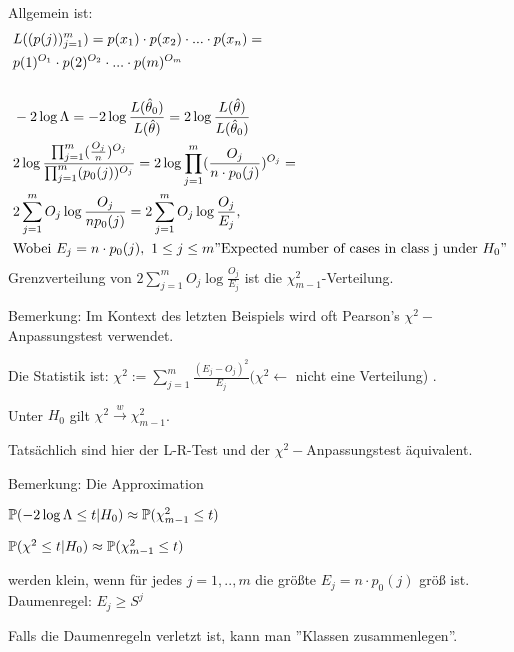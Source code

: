 \documentclass{tstextbook}
\begin{document}
\begin{example}
	Allgemein ist: 
	  \[
	\begin{aligned}
		& L((p(j))^{m}_{j=1}) = p(x_1)\cdot p(x_2)\cdot ... \cdot p(x_n)=\\
		& p(1)^{O_1} \cdot p(2)^{O_2} \cdot ... \cdot p(m)^{O_m} \\
		& \\
		& -2 \log \Lambda = -2 \log \frac{L(\hat{\theta}_0 )}{L(\hat{\theta})}=  2 \log \frac{L(\hat{\theta})}{L(\hat{\theta}_0 )} \\
		& 2 \log \frac{\prod_{j=1}^{m}(\frac{O_j}{n})^{O_j}}{\prod_{j=1}^{m} (p_0(j))^{O_j}} =  2 \log \prod_{j=1}^{m}(\frac{O_j}{n \cdot p_0(j)})^{O_j} = \\
		& 2 \sum_{j=1}^{m} O_j \log \frac{O_j}{n p_0(j)}=  2 \sum_{j=1}^{m} O_j \log \frac{O_j}{E_j} , \\			
		& \text{Wobei } E_j=n\cdot p_0(j), \ 1 \leq j \leq m \text {''Expected number of  cases in class j under } H_0 " 
	\end{aligned}
	\]
	Grenzverteilung von $2 \sum_{j=1}^{m} O_j \log \frac{O_j}{E_j}$ ist die $\chi_{m-1}^2$-Verteilung.
	
	\end{example}
	
	\begin{remark}
		Bemerkung: Im Kontext des letzten Beispiels wird oft Pearson's $\chi^2 -$Anpassungstest verwendet. 
	
		Die Statistik ist: $\chi^2 := \sum_{j=1}^{m} \frac{(E_j-O_j)^2}{E_j} (\chi^2 \leftarrow $ nicht eine Verteilung) .
		
		Unter $H_0$ gilt $\chi^2 \overset{w}{\rightarrow} \chi_{m-1}^{2}$.
		
		Tatsächlich sind hier der L-R-Test und der $\chi^2 -$Anpassungstest äquivalent.
	\end{remark}
	
	\begin{remark}
		Bemerkung: Die Approximation 
		
		$\mathbb P(-2 \log \Lambda \le t | H_0) \approx \mathbb P( \chi_{m-1}^2 \le t)$
		
		$ \mathbb P( \chi^2 \le t | H_0) \approx  \mathbb P( \chi_{m-1}^2 \le t) $
		
		werden klein, wenn für jedes $j=1,..,m$ die größte $E_j = n \cdot p_0(j)$ größ ist. Daumenregel: $E_j \geq S^j$
	\end{remark}
	
	Falls die Daumenregeln verletzt ist, kann man ''Klassen zusammenlegen''.
	
\end{document}
